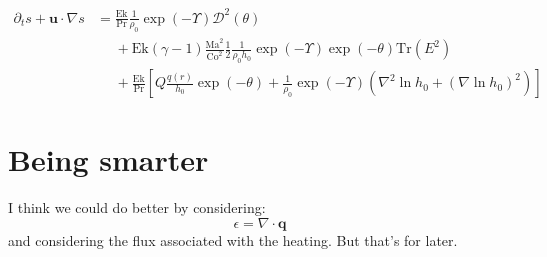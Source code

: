\documentclass{aastex62}
\newcommand{\del}{\nabla}
\renewcommand{\vec}{\boldsymbol}
\newcommand{\scrD}{\mathcal{D}}
\begin{document}
\begin{align}
  \partial_t s + \vec{u}\cdot \del s &=
  \frac{\mathrm{Ek}}{\mathrm{Pr}} \frac{1}{\rho_0} \exp(-\Upsilon)\scrD^2(\theta) \nonumber\\
  &\phantom{=}+ \mathrm{Ek} (\gamma-1)\frac{\mathrm{Ma}^{2}}{\mathrm{Co}^2} \frac{1}{2}\frac{1}{\rho_0 h_0}\exp(-\Upsilon) \exp(-\theta)\mathrm{Tr}(E^2)\nonumber\\
  &\phantom{=}+ \frac{\mathrm{Ek}}{\mathrm{Pr}}\left[Q \frac{q(r)}{h_0}\exp(-\theta) +  \frac{1}{\rho_0} \exp(-\Upsilon) \left(\nabla^2 \ln h_0 + (\nabla \ln h_0)^2 \right)\right]
\end{align}

\section{Being smarter}
I think we could do better by considering:
\begin{equation}
  \epsilon = \del \cdot \vec{q}
\end{equation}
and considering the flux associated with the heating.  But that's for later.
\end{document}
